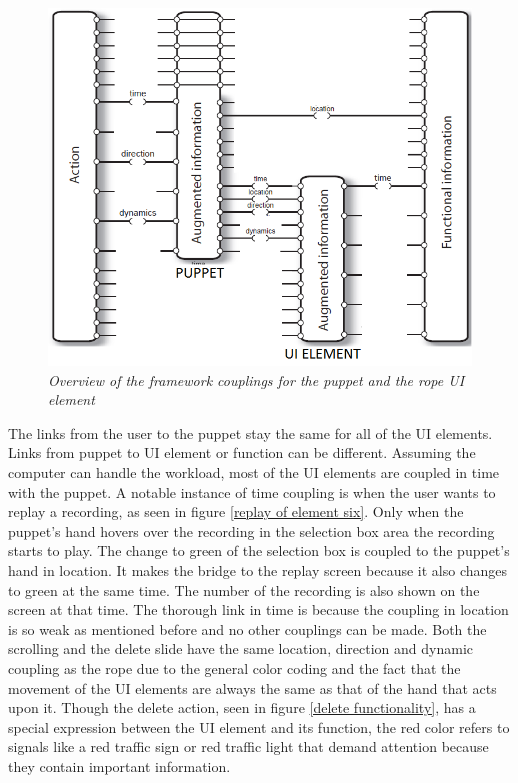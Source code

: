 \begin{figure}[H]
	\begin{center}
		\includegraphics[width=14cm]{figures/standard_framework_Rope.png}
		\caption{\emph{Overview of the framework couplings for the puppet and the rope UI element}}
		\label{puppet_rope_framework}
	\end{center}
\end{figure}

The links from the user to the puppet stay the same for all of the UI elements. Links from puppet to UI element or function can be different. Assuming the computer can handle the workload, most of the UI elements are coupled in time with the puppet. A notable instance of time coupling is when the user wants to replay a recording, as seen in figure \ref{replay of element six}. Only when the puppet's hand hovers over the recording in the selection box area the recording starts to play. The change to green of the selection box is coupled to the puppet's hand in location. It makes the bridge to the replay screen because it also changes to green at the same time. The number of the recording is also shown on the screen at that time. The thorough link in time is because the coupling in location is so weak as mentioned before and no other couplings can be made. Both the scrolling and the delete slide have the same location, direction and dynamic coupling as the rope due to the general color coding and the fact that the movement of the UI elements are always the same as that of the hand that acts upon it. Though the delete action, seen in figure \ref{delete functionality}, has a special expression between the UI element and its function, the red color refers to signals like a red traffic sign or red traffic light that demand attention because they contain important information. 

